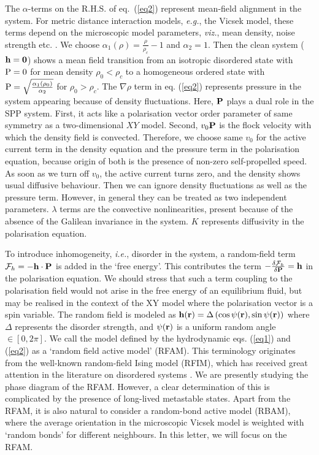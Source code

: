 \documentclass[pre,twocolumn,amssymb,showpacs,superscriptaddress,notitlepage]{revtex4-1}
\begin{document}
The $\alpha$-terms on the R.H.S. of eq.~(\ref{eq2}) represent mean-field alignment in the system. For metric distance
interaction models, {\it e.g.}, the Vicsek model, these terms depend on the microscopic model parameters, 
{\it viz.}, mean density, noise strength etc. \cite{bertinnjop2009}. We choose $\alpha_1(\rho) = \frac{\rho}{\rho_c}-1$ and 
$\alpha_2=1$. Then the clean system (${\bf h}={\bf 0}$) shows a mean field transition from an isotropic disordered state 
with  ${\rm P}=0$ for mean density $\rho_0 < \rho_c$ to a homogeneous ordered state with ${\rm P}=\sqrt{\frac{\alpha_1(\rho_0)}{\alpha_2}}$ for $\rho_0 > \rho_c$. The $\nabla \rho$ term in eq. (\ref{eq2}) represents pressure in the system appearing because of density fluctuations. Here, ${\bf P}$ plays a dual role in the SPP system. First, it acts like a polarisation vector order parameter of same symmetry as a two-dimensional $XY$ model. Second, $v_0 {\bf P}$ is the flock velocity with which the density field is convected. Therefore, we choose same $v_0$ for the active current term in the density equation and the pressure term in the polarisation equation, because origin of both is the presence of non-zero self-propelled speed. As soon as we turn off $v_0$, the active current turns zero, and the density shows usual diffusive behaviour. Then we can ignore density fluctuations as well as the pressure term. However, in general they can be treated as two independent parameters. $\lambda$ terms  are the convective nonlinearities, present because of the absence of the Galilean invariance in the system. $K$ represents diffusivity in the  polarisation equation. 

To introduce inhomogeneity, {\it i.e.}, disorder in the system, a random-field term $\mathcal{F}_h=-{\bf h} \cdot {\bf P}$ is added 
in the `free energy'. This contributes the term  $-\frac{\delta \mathcal{F}_h}{\delta \bf  P} = {\bf h}$  in the  polarisation 
equation.  We should stress that such a term coupling to the polarisation field would not arise in the free 
energy of an equilibrium fluid, but may be realised in the context of the XY model where the polarisation vector is a spin variable. 
The random field is modeled as ${\bf h}({\bf r})=\Delta\left(\cos\psi({\bf r}),\sin\psi({\bf r})\right)$ where $\Delta$ represents
the disorder strength, and $\psi({\bf r})$ is a uniform random angle $\in [0, 2 \pi]$. We call the model defined by the hydrodynamic 
eqs. (\ref{eq1}) and (\ref{eq2}) as a `random field active model' (RFAM). This terminology originates from the well-known random-field 
Ising model (RFIM), which has received great attention in the literature on disordered systems  \cite{im75,tn98}. 
We are presently studying the phase diagram of the RFAM. However, a clear determination of this is complicated by the presence 
of long-lived metastable states. Apart from the RFAM, it is also natural to consider a random-bond active model (RBAM), 
where the average orientation  in the microscopic Vicsek model is weighted with `random bonds' for different 
neighbours. In this letter, we will focus on the RFAM.
\end{document}
